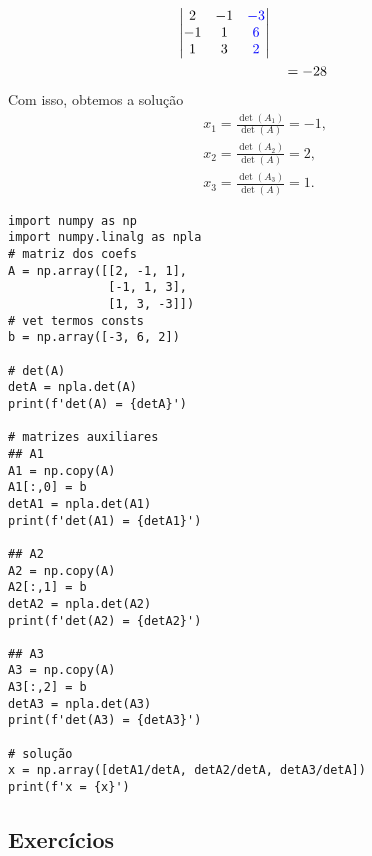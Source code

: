 \begin{ex}
\begin{align}
\begin{vmatrix}
                2 & -1 & {\color{blue}-3}\\
                -1 & 1 & {\color{blue}6}\\
                1 & 3 & {\color{blue}2}
              \end{vmatrix}\\
    & \text{}\quad = -28
  \end{align}
  Com isso, obtemos a solução
  \begin{align}
    & x_1 = \frac{\det(A_1)}{\det(A)} = -1, \\
    & x_2 = \frac{\det(A_2)}{\det(A)} = 2, \\
    & x_3 = \frac{\det(A_3)}{\det(A)} = 1.
  \end{align}

\begin{lstlisting}
import numpy as np
import numpy.linalg as npla
# matriz dos coefs
A = np.array([[2, -1, 1],
              [-1, 1, 3],
              [1, 3, -3]])
# vet termos consts
b = np.array([-3, 6, 2])

# det(A)
detA = npla.det(A)
print(f'det(A) = {detA}')

# matrizes auxiliares
## A1
A1 = np.copy(A)
A1[:,0] = b
detA1 = npla.det(A1)
print(f'det(A1) = {detA1}')

## A2
A2 = np.copy(A)
A2[:,1] = b
detA2 = npla.det(A2)
print(f'det(A2) = {detA2}')

## A3
A3 = np.copy(A)
A3[:,2] = b
detA3 = npla.det(A3)
print(f'det(A3) = {detA3}')

# solução
x = np.array([detA1/detA, detA2/detA, detA3/detA])
print(f'x = {x}')
\end{lstlisting}

\end{ex}


\subsection{Exercícios}

